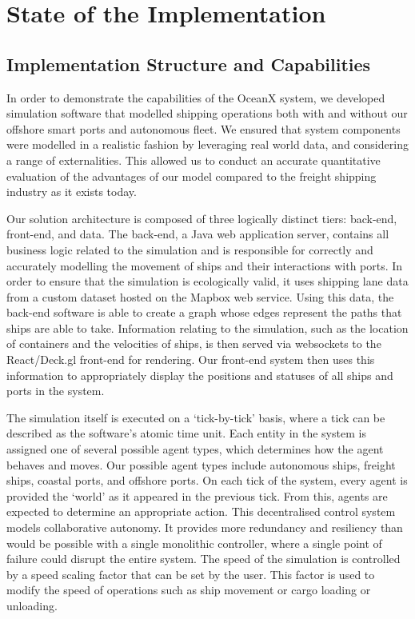 \newpage
\section{State of the Implementation}

\subsection{Implementation Structure and Capabilities}

In order to demonstrate the capabilities of the OceanX system, we developed simulation software that modelled shipping operations both with and without our offshore smart ports and autonomous fleet. We ensured that system components were modelled in a realistic fashion by leveraging real world data, and considering a range of externalities. This allowed us to conduct an accurate quantitative evaluation of the advantages of our model compared to the freight shipping industry as it exists today.

Our solution architecture is composed of three logically distinct tiers: back-end, front-end, and data. The back-end, a Java web application server, contains all business logic related to the simulation and is responsible for correctly and accurately modelling the movement of ships and their interactions with ports. In order to ensure that the simulation is ecologically valid, it uses shipping lane data from a custom dataset hosted on the Mapbox web service. Using this data, the back-end software is able to create a graph whose edges represent the paths that ships are able to take. Information relating to the simulation, such as the location of containers and the velocities of ships, is then served via websockets to the React/Deck.gl front-end for rendering. Our front-end system then uses this information to appropriately display the positions and statuses of all ships and ports in the system.

The simulation itself is executed on a `tick-by-tick’ basis, where a tick can be described as the software’s atomic time unit. Each entity in the system is assigned one of several possible agent types, which determines how the agent behaves and moves. Our possible agent types include autonomous ships, freight ships, coastal ports, and offshore ports. On each tick of the system, every agent is provided the ‘world’ as it appeared in the previous tick. From this, agents are expected to determine an appropriate action. This decentralised control system models collaborative autonomy. It provides more redundancy and resiliency than would be possible with a single monolithic controller, where a single point of failure could disrupt the entire system. The speed of the simulation is controlled by a speed scaling factor that can be set by the user. This factor is used to modify the speed of operations such as ship movement or cargo loading or unloading. 

